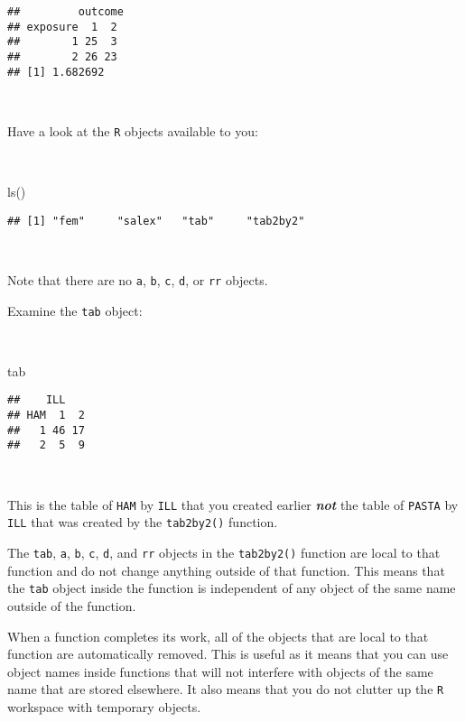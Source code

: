 \documentclass[
  12pt,
  a4paper]{book}
\newenvironment{Shaded}{\begin{snugshade}}{\end{snugshade}}
\newcommand{\FunctionTok}[1]{\textcolor[rgb]{0.00,0.00,0.00}{#1}}
\newcommand{\NormalTok}[1]{#1}
\begin{document}
\begin{verbatim}
##         outcome
## exposure  1  2
##        1 25  3
##        2 26 23
## [1] 1.682692
\end{verbatim}

~

Have a look at the \texttt{R} objects available to you:

~

\begin{Shaded}
\begin{Highlighting}[]
\FunctionTok{ls}\NormalTok{()}
\end{Highlighting}
\end{Shaded}

\begin{verbatim}
## [1] "fem"     "salex"   "tab"     "tab2by2"
\end{verbatim}

~

Note that there are no \texttt{a}, \texttt{b}, \texttt{c}, \texttt{d}, or \texttt{rr} objects.

\newpage

Examine the \texttt{tab} object:

~

\begin{Shaded}
\begin{Highlighting}[]
\NormalTok{tab}
\end{Highlighting}
\end{Shaded}

\begin{verbatim}
##    ILL
## HAM  1  2
##   1 46 17
##   2  5  9
\end{verbatim}

~

This is the table of \texttt{HAM} by \texttt{ILL} that you created earlier \textbf{\emph{not}} the table of \texttt{PASTA} by \texttt{ILL} that was created by the \texttt{tab2by2()} function.

The \texttt{tab}, \texttt{a}, \texttt{b}, \texttt{c}, \texttt{d}, and \texttt{rr} objects in the \texttt{tab2by2()} function are local to that function and do not change anything outside of that function. This means that the \texttt{tab} object inside the function is independent of any object of the same name outside of the function.

When a function completes its work, all of the objects that are local to that function are automatically removed. This is useful as it means that you can use object names inside functions that will not interfere with objects of the same name that are stored elsewhere. It also means that you do not clutter up the \texttt{R} workspace with temporary objects.
\end{document}
